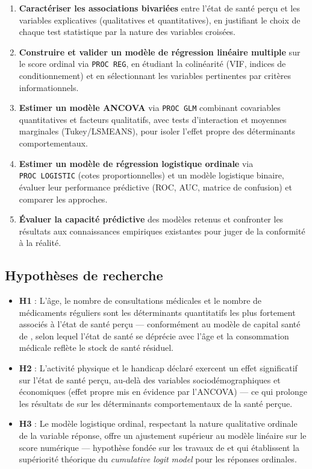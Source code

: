 \documentclass[11pt,a4paper]{memoirerecherche}
\providecommand{\tightlist}{%
  \setlength{\itemsep}{0pt}\setlength{\parskip}{0pt}}
\begin{document}
\begin{enumerate}
\def\labelenumi{\arabic{enumi}.}
\tightlist
\item
  \textbf{Caractériser les associations bivariées} entre l'état de santé perçu et les variables explicatives (qualitatives et quantitatives), en justifiant le choix de chaque test statistique par la nature des variables croisées.
\item
  \textbf{Construire et valider un modèle de régression linéaire multiple} sur le score ordinal via \texttt{PROC\ REG}, en étudiant la colinéarité (VIF, indices de conditionnement) et en sélectionnant les variables pertinentes par critères informationnels.
\item
  \textbf{Estimer un modèle ANCOVA} via \texttt{PROC\ GLM} combinant covariables quantitatives et facteurs qualitatifs, avec tests d'interaction et moyennes marginales (Tukey/LSMEANS), pour isoler l'effet propre des déterminants comportementaux.
\item
  \textbf{Estimer un modèle de régression logistique ordinale} via \texttt{PROC\ LOGISTIC} (cotes proportionnelles) et un modèle logistique binaire, évaluer leur performance prédictive (ROC, AUC, matrice de confusion) et comparer les approches.
\item
  \textbf{Évaluer la capacité prédictive} des modèles retenus et confronter les résultats aux connaissances empiriques existantes pour juger de la conformité à la réalité.
\end{enumerate}

\hypertarget{hypothuxe8ses-de-recherche}{%
\subsection{Hypothèses de recherche}\label{hypothuxe8ses-de-recherche}}

\begin{itemize}
\tightlist
\item
  \textbf{H1} : L'âge, le nombre de consultations médicales et le nombre de médicaments réguliers sont les déterminants quantitatifs les plus fortement associés à l'état de santé perçu --- conformément au modèle de capital santé de \textcite{grossman1972}, selon lequel l'état de santé se déprécie avec l'âge et la consommation médicale reflète le stock de santé résiduel.
\item
  \textbf{H2} : L'activité physique et le handicap déclaré exercent un effet significatif sur l'état de santé perçu, au-delà des variables sociodémographiques et économiques (effet propre mis en évidence par l'ANCOVA) --- ce qui prolonge les résultats de \textcite{singh2006} sur les déterminants comportementaux de la santé perçue.
\item
  \textbf{H3} : Le modèle logistique ordinal, respectant la nature qualitative ordinale de la variable réponse, offre un ajustement supérieur au modèle linéaire sur le score numérique --- hypothèse fondée sur les travaux de \textcite{mccullagh1980} et \textcite{agresti2010} qui établissent la supériorité théorique du \emph{cumulative logit model} pour les réponses ordinales.
\end{itemize}
\end{document}
